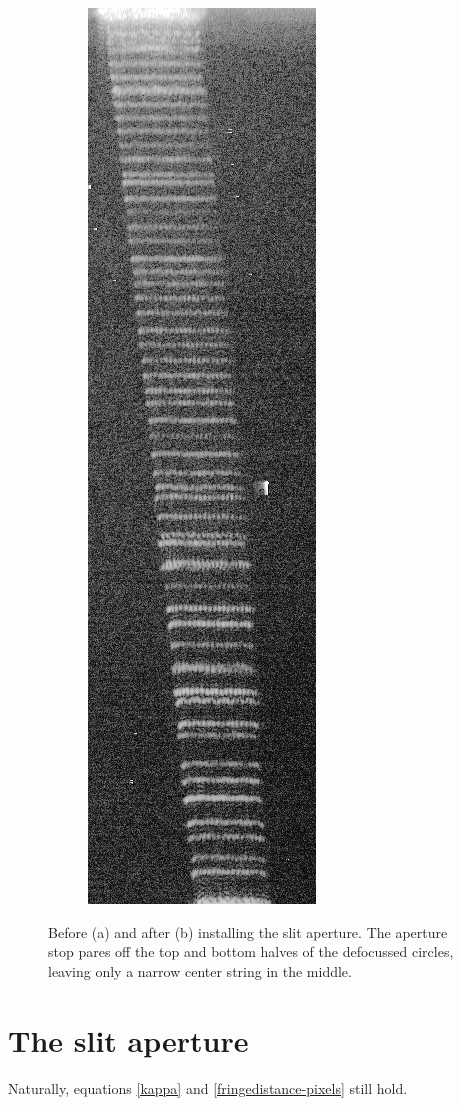 \documentclass[11.5pt]{book}
\begin{document}
\begin{figure}[h!]
\begin{subfigure}[b]{0.4\textwidth}
        \includegraphics[height=0.6\textheight]{img/slitted.jpg}
        \caption{}
    \end{subfigure}
    \caption{Before (a) and after (b) installing the slit aperture. The aperture
    stop pares off the top and bottom halves of the defocussed circles, leaving
only a narrow center string in the middle.}
    \label{fig:globalsizing}
\end{figure}

\section{The slit aperture}
Naturally, equations \eqref{kappa} and \eqref{fringedistance-pixels} still hold.
\end{document}
